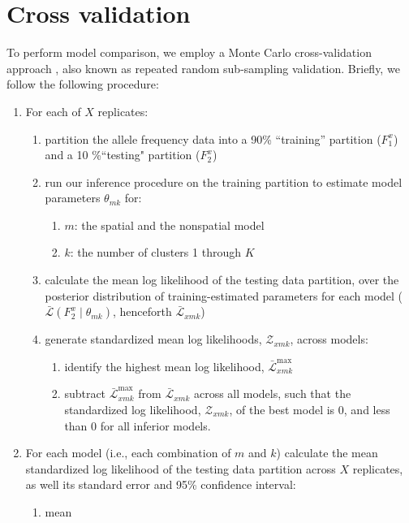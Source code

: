 \documentclass[12pt]{article}
\begin{document}
\section{Cross validation}
To perform model comparison, we employ a Monte Carlo cross-validation approach \citep{picard1984},
also known as repeated random sub-sampling validation.
Briefly, we follow the following procedure:
\begin{enumerate}
\item For each of $X$ replicates:
	\begin{enumerate}
		\item partition the allele frequency data into a 90\% ``training'' partition ($F^x_1$) and a 10 \%``testing" partition ($F^x_2$) \label{partition}
		\item run our inference procedure on the training partition to estimate model parameters $\theta_{mk}$ for: \label{inference}
			\begin{enumerate}
				\item $m$: the spatial and the nonspatial model
				\item $k$: the number of clusters 1 through $K$
			\end{enumerate}	
	\item calculate the mean log likelihood of the testing data partition, 
	over the posterior distribution of training-estimated parameters for each model 
	($\bar{\mathcal{L}}(F^x_2 \mid \theta_{mk})$, henceforth $\bar{\mathcal{L}}_{xmk}$) \label{lnL}
	\item generate standardized mean log likelihoods, $\mathcal{Z}_{xmk}$, across models: \label{standardize}
		\begin{enumerate}
			\item identify the highest mean log likelihood, $\bar{\mathcal{L}}^\text{max}_{xmk}$
			\item subtract $\bar{\mathcal{L}}^\text{max}_{xmk}$ from $\bar{\mathcal{L}}_{xmk}$ across all models,
				such that the standardized log likelihood, $\mathcal{Z}_{xmk}$, of the best model is 0,
				and less than 0 for all inferior models. 
		\end{enumerate}
	\end{enumerate}
\item For each model (i.e., each combination of $m$ and $k$) calculate 
	the mean standardized log likelihood of the testing data partition across $X$ replicates, 
	as well its standard error and 95\% confidence interval:
	\begin{enumerate}
	\item mean

\end{enumerate}
\end{enumerate}
\end{document}
